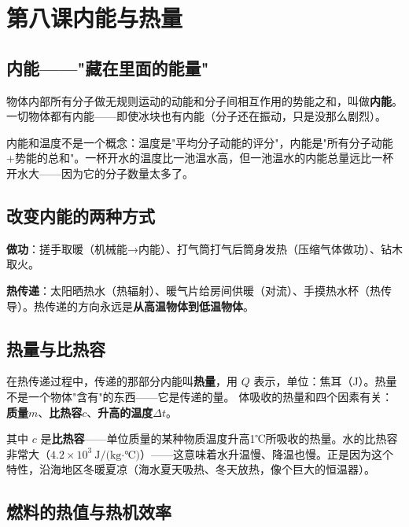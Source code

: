 \documentclass[a4paper,12pt]{ctexart}
\newenvironment{definition}[1]{
  \vspace{0.2cm}
  \begin{center}
  \begin{minipage}{0.88\textwidth}
  \fbox{
  \begin{minipage}{0.92\textwidth}
  \vspace{0.1cm}
  \textbf{\textcolor{defblue}{【 #1 】}}
}{
  \vspace{0.1cm}
  \end{minipage}}
  \end{minipage}
  \end{center}
  \vspace{0.2cm}
}
\newcommand{\formula}[1]{\begin{center}\textcolor{formulared}{\large\boxed{#1}}\end{center}}
\begin{document}
\newpage

\section{\textcolor{orange!80!black}{第八课\quad 内能与热量}}

\subsection*{内能——"藏在里面的能量"}

物体内部所有分子做无规则运动的动能和分子间相互作用的势能之和，叫做\textbf{内能}。一切物体都有内能——即使冰块也有内能（分子还在振动，只是没那么剧烈）。

内能和温度不是一个概念：温度是"平均分子动能的评分"，内能是"所有分子动能+势能的总和"。一杯开水的温度比一池温水高，但一池温水的内能总量远比一杯开水大——因为它的分子数量太多了。

\subsection*{改变内能的两种方式}

\textbf{做功}：搓手取暖（机械能→内能）、打气筒打气后筒身发热（压缩气体做功）、钻木取火。

\textbf{热传递}：太阳晒热水（热辐射）、暖气片给房间供暖（对流）、手摸热水杯（热传导）。热传递的方向永远是\textbf{从高温物体到低温物体}。

\subsection*{热量与比热容}

\begin{definition}{热量}
在热传递过程中，传递的那部分内能叫\textbf{热量}，用 $Q$ 表示，单位：焦耳（J）。热量不是一个物体"含有"的东西——它是传递的量。
\end{definition}

物体吸收的热量和四个因素有关：\textbf{质量}$m$、\textbf{比热容}$c$、\textbf{升高的温度}$\Delta t$。


其中 $c$ 是\textbf{比热容}——单位质量的某种物质温度升高1℃所吸收的热量。水的比热容非常大（$4.2 \times 10^3\ \text{J/(kg·℃)}$）——这意味着水升温慢、降温也慢。正是因为这个特性，沿海地区冬暖夏凉（海水夏天吸热、冬天放热，像个巨大的恒温器）。

\subsection*{燃料的热值与热机效率}
\end{document}
